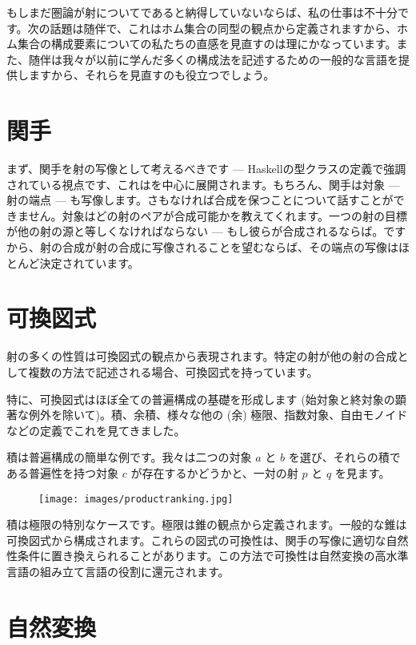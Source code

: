 
\lettrine[lhang=0.17]{も}{し}まだ圏論が射についてであると納得していないならば、私の仕事は不十分です。次の話題は随伴で、これはホム集合の同型の観点から定義されますから、ホム集合の構成要素についての私たちの直感を見直すのは理にかなっています。また、随伴は我々が以前に学んだ多くの構成法を記述するための一般的な言語を提供しますから、それらを見直すのも役立つでしょう。

\section{関手}

まず、関手を射の写像として考えるべきです --- Haskellの型クラスの定義で強調されている視点です、これはを中心に展開されます。もちろん、関手は対象 --- 射の端点 --- も写像します。さもなければ合成を保つことについて話すことができません。対象はどの射のペアが合成可能かを教えてくれます。一つの射の目標が他の射の源と等しくなければならない --- もし彼らが合成されるならば。ですから、射の合成が射の合成に写像されることを望むならば、その端点の写像はほとんど決定されています。

\section{可換図式}

射の多くの性質は可換図式の観点から表現されます。特定の射が他の射の合成として複数の方法で記述される場合、可換図式を持っています。

特に、可換図式はほぼ全ての普遍構成の基礎を形成します (始対象と終対象の顕著な例外を除いて)。積、余積、様々な他の (余) 極限、指数対象、自由モノイドなどの定義でこれを見てきました。

積は普遍構成の簡単な例です。我々は二つの対象 $a$ と $b$ を選び、それらの積である普遍性を持つ対象 $c$ が存在するかどうかと、一対の射 $p$ と $q$ を見ます。

\begin{figure}[H]
  \centering
  \texttt{[image: images/productranking.jpg]}
\end{figure}

\noindent
積は極限の特別なケースです。極限は錐の観点から定義されます。一般的な錐は可換図式から構成されます。これらの図式の可換性は、関手の写像に適切な自然性条件に置き換えられることがあります。この方法で可換性は自然変換の高水準言語の組み立て言語の役割に還元されます。

\section{自然変換}

